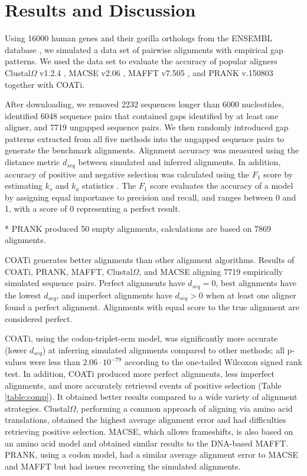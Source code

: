 \section*{Results and Discussion}
Using 16000 human genes and their gorilla orthologs from the ENSEMBL
database , we simulated a data set of pairwise
alignments with empirical gap patterns.
We used the data set to evaluate the accuracy of popular aligners
Clustal$\Omega$ v1.2.4 ,
MACSE v2.06 , MAFFT v7.505
, and PRANK v.150803 
together with COATi.

After downloading, we removed 2232 sequences longer than 6000 nucleotides, identified 6048 sequence pairs that contained gaps identified by at least one aligner, and 7719 ungapped sequence pairs.
We then randomly introduced gap patterns extracted from all five methods into the ungapped sequence pairs to generate the benchmark alignments.
Alignment accuracy was measured using the distance metric $d_{seq}$
 between simulated and inferred
alignments.
In addition, accuracy of positive and negative selection was calculated
using the $F_1$ score by estimating $k_s$ and $k_a$ statistics
.
The $F_1$ score evaluates the accuracy of a model by assigning equal importance to precision and recall, and ranges between 0 and 1, with a score of 0 representing a perfect result.

\begin{table}[!ht]
\centering

 \vspace{1mm}
 \footnotesize{* PRANK produced 50 empty alignments, calculations are based on 7869 alignments.}
 \caption{COATi generates better alignments than other alignment algorithms. Results of COATi, PRANK, MAFFT, Clustal$\Omega$, and MACSE aligning 7719 empirically simulated sequence pairs. Perfect alignments have $d_{seq}=0$, best alignments have the lowest $d_{seq}$, and imperfect alignments have $d_{seq}>0$ when at least one aligner found a perfect alignment. Alignments with equal score to the true alignment are considered perfect.}
 \label{table:comp}
\end{table}

COATi, using the codon-triplet-ecm model, was significantly more accurate (lower $d_{seq}$) at inferring simulated alignments compared to other methods; all p-values were less than $2.06 \cdot 10^{-79}$ according to the one-tailed Wilcoxon signed rank test.
In addition, COATi produced more perfect alignments, less imperfect alignments, and more accurately retrieved events of positive selection (Table \ref{table:comp}).
It obtained better results compared to a wide variety of alignment strategies.
Clustal$\Omega$, performing a common approach of aligning via amino acid translations, obtained the highest average alignment error and had difficulties retrieving positive selection.
MACSE, which allows frameshifts, is also based on an amino acid model and obtained similar results to the DNA-based MAFFT.
PRANK, using a codon model, had a similar average alignment error to MACSE and MAFFT but had issues recovering the simulated alignments.

